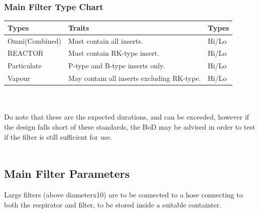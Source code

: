 \documentclass[a4paper, 12pt, oneside]{article}
\begin{document}
{			\subsubsection{Main Filter Type Chart}
				\begin{tabular}{|p{3cm}||p{8.44cm}|p{1cm}|}
					\hline
					Types & Traits & Types \\\hline
					Omni(Combined) & Must contain all inserts. & Hi/Lo \\
					REACTOR & Must contain RK-type insert. & Hi/Lo \\
					Particulate & P-type and B-type inserts only. & Hi/Lo \\
					Vapour & May contain all inserts excluding RK-type. & Hi/Lo \\\hline	
				\end{tabular} \\ \-\\
				\small *Do note that these are the expected durations, and can be exceeded, however if the design falls short of these standards, the BoD may be advised in order to test if the filter is still sufficient for use. \normalsize \\ \-\\
		\subsection{Main Filter Parameters}
			Large filters (above diameterx10) are to be connected to a hose connecting to both the respirator and filter, to be stored inside a suitable containter. \\ \-\\
			
}
\end{document}
